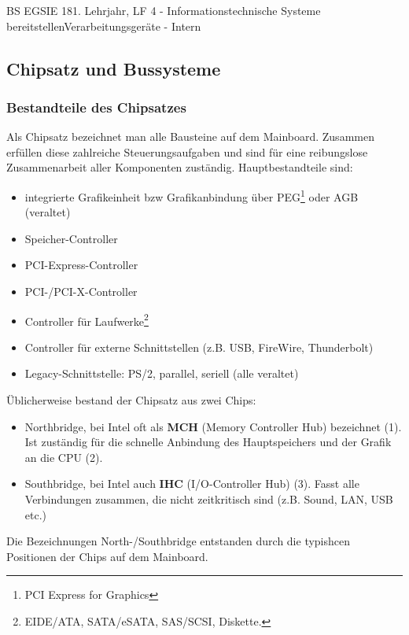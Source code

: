 \documentclass[oneside,openany,headings=optiontotoc,11pt,numbers=noenddot]{article}
\begin{document}
	\begin{worksheet}{BS EGSIE 18}{1. Lehrjahr, LF 4 - Informationstechnische Systeme bereitstellen}{Verarbeitungsgeräte - Intern}
		\onehalfspacing
		\clearpage
		\setcounter{page}{7}
		\setcounter{section}{1}
		\setcounter{subsection}{2}
		\subsection{Chipsatz und Bussysteme}
		\subsubsection*{Bestandteile des Chipsatzes}
		Als \glqq{}Chipsatz\grqq{} bezeichnet man alle Bausteine auf dem Mainboard. Zusammen erfüllen diese zahlreiche Steuerungsaufgaben und sind für eine reibungslose Zusammenarbeit aller Komponenten zuständig. Hauptbestandteile sind:
		\begin{itemize}[label=-]
			\item integrierte Grafikeinheit bzw Grafikanbindung über PEG\footnote{PCI Express for Graphics} oder AGB (veraltet)
			\item Speicher-Controller
			\item PCI-Express-Controller
			\item PCI-/PCI-X-Controller
			\item Controller für Laufwerke\footnote{EIDE/ATA, SATA/eSATA, SAS/SCSI, Diskette.}
			\item Controller für externe Schnittstellen (z.B. USB, FireWire, Thunderbolt)
			\item Legacy-Schnittstelle: PS/2, parallel, seriell (alle veraltet)
		\end{itemize}
		Üblicherweise bestand der Chipsatz aus zwei Chips:\\
		\par\noindent
		\begin{minipage}[l]{0.48\textwidth}
			\begin{itemize}[label=-]
				\item Northbridge, bei Intel oft als \textbf{MCH} (Memory Controller Hub) bezeichnet (1). Ist zuständig für die schnelle Anbindung des Hauptspeichers und der Grafik an die CPU (2).
				\item Southbridge, bei Intel auch \textbf{IHC} (I/O-Controller Hub) (3). Fasst alle Verbindungen zusammen, die nicht zeitkritisch sind (z.B. Sound, LAN, USB etc.)
			\end{itemize}
			Die Bezeichnungen North-/Southbridge entstanden durch die typishcen Positionen der Chips auf dem Mainboard.

\end{minipage}
\end{worksheet}
\end{document}
